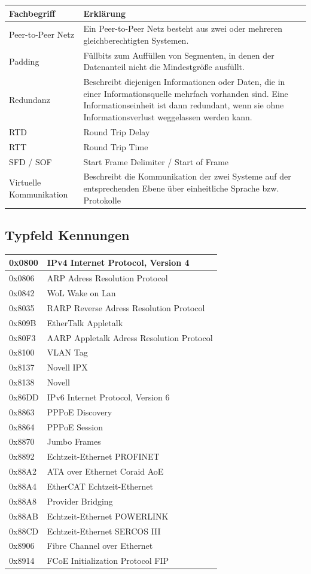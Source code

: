 \documentclass[12pt,a4paper]{article}
\begin{document}
\begin{tabularx}{17cm}{|l|X|}
\hline
Fachbegriff&Erklärung\\
\hline
\hline
Peer-to-Peer Netz&Ein Peer-to-Peer Netz besteht aus zwei oder mehreren gleichberechtigten Systemen.\\
\hline
Padding&Füllbits zum Auffüllen von Segmenten, in denen der Datenanteil nicht die Mindestgröße ausfüllt.\\
\hline
Redundanz&Beschreibt diejenigen Informationen oder Daten, die in einer Informationsquelle mehrfach vorhanden sind. Eine Informationseinheit ist dann redundant, wenn sie ohne Informationsverlust weggelassen werden kann.\\
\hline
RTD&Round Trip Delay\\
\hline
RTT&Round Trip Time\\
\hline
SFD / SOF& Start Frame Delimiter / Start of Frame\\
\hline
Virtuelle Kommunikation&Beschreibt die Kommunikation der zwei Systeme auf der entsprechenden Ebene über einheitliche Sprache bzw. Protokolle\\
\hline
\end{tabularx}
\subsection{Typfeld Kennungen}
\begin{center}
\renewcommand{\arraystretch}{2}
\begin{tabularx}{17cm}{|l|X|}
\hline
0x0800&IPv4 Internet Protocol, Version 4\\
\hline
0x0806&ARP Adress Resolution Protocol\\
\hline
0x0842&WoL Wake on Lan\\
\hline
0x8035&RARP Reverse Adress Resolution Protocol\\
\hline
0x809B&EtherTalk Appletalk\\
\hline
0x80F3&AARP Appletalk Adress Resolution Protocol\\
\hline
0x8100&VLAN Tag\\
\hline
0x8137&Novell IPX\\
\hline
0x8138&Novell\\
\hline
0x86DD&IPv6 Internet Protocol, Version 6\\
\hline
0x8863&PPPoE Discovery\\
\hline
0x8864&PPPoE Session\\
\hline
0x8870&Jumbo Frames\\
\hline
0x8892&Echtzeit-Ethernet PROFINET\\
\hline
0x88A2&ATA over Ethernet Coraid AoE\\
\hline
0x88A4&EtherCAT Echtzeit-Ethernet\\
\hline
0x88A8&Provider Bridging\\
\hline
0x88AB&Echtzeit-Ethernet POWERLINK\\
\hline
0x88CD&Echtzeit-Ethernet SERCOS III\\
\hline
0x8906&Fibre Channel over Ethernet\\
\hline
0x8914&FCoE Initialization Protocol FIP\\
\hline
\end{tabularx}
\end{center}
\newpage
\end{document}
